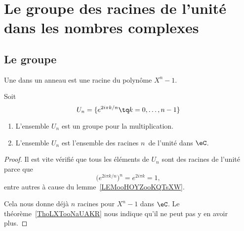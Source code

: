
\section{Le groupe des racines de l'unité dans les nombres complexes}
\label{SecGJOLooWdMYVl}

\subsection{Le groupe}

\begin{definition}      \label{DEFooDUWPooZaAByH}
	Une  dans un anneau est une racine du polynôme \( X^n-1\).
\end{definition}

\begin{lemmaDef}        \label{LEMooSXFBooYJmRTK}
	Soit
	\begin{equation}        \label{EqIEAXooIpvFPe}
		U_n=\{  e^{2i\pi k/n}  \tq k=0,\ldots, n-1 \}
	\end{equation}
	\begin{enumerate}
		\item
		      L'ensemble \( U_n\) est un groupe pour la multiplication.
		\item
		      L'ensemble \( U_n\) est l'ensemble des racines \( n\)\ieme\ de l'unité dans \( \eC\).
	\end{enumerate}
\end{lemmaDef}

\begin{proof}
	Il est vite vérifié que tous les éléments de \( U_n\) sont des racines de l'unité parce que
	\begin{equation}
		\big(  e^{2i\pi k/n} \big)^n= e^{2i\pi k}=1,
	\end{equation}
	entre autres à cause du lemme~\ref{LEMooHOYZooKQTsXW}.

	Cela nous donne déjà \( n\) racines pour \( X^n-1\) dans \( \eC\). Le théorème~\ref{ThoLXTooNaUAKR} nous indique qu'il ne peut pas y en avoir plus.
\end{proof}


